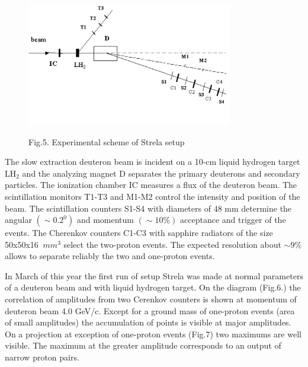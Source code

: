 \documentclass[a4paper,12pt]{article}
\begin{document}
\begin{figure}[hbt]
  \begin{center}
    \includegraphics[width=9cm]{image2.pdf}
  \end{center}
  \vspace{0,4mm}
  \noindent
  Fig.5. Experimental scheme of Strela setup \\
\end{figure}

The slow extraction deuteron beam is incident on a 10-cm liquid hydrogen
target
LH$_2$ and the analyzing magnet D separates the primary deuterons and
secondary
particles. The ionization chamber IC measures a flux of the deuteron
beam. The
scintillation monitors T1-T3 and M1-M2 control the intensity and position
of the
beam. The scintillation counters S1-S4 with diameters of 48 mm determine the
angular $(\sim 0.2^0)$ and momentum $(\sim 10\%)$
acceptance and trigger of the events.
The Cherenkov counters C1-C3 with sapphire radiators of the size
50x50x16
$~mm^{3}$
select the two-proton events. The expected resolution about $\sim9\%$
allows to separate reliably the two and one-proton events.

In March of this year the first run of setup  Strela  was made at normal
parameters of a
deuteron beam and with  liquid hydrogen target.   On the diagram (Fig.6.)   the
correlation of amplitudes  from two Cerenkov counters is shown at momentum of
deuteron beam 4.0 GeV/c.  Except for a ground  mass  of one-proton events (area
of small amplitudes) the accumulation of points is visible at major amplitudes.
On a projection at exception of one-proton events (Fig.7) two maximums are well
visible.  The maximum at  the greater amplitude corresponds to an output of
narrow proton pairs.
\end{document}

